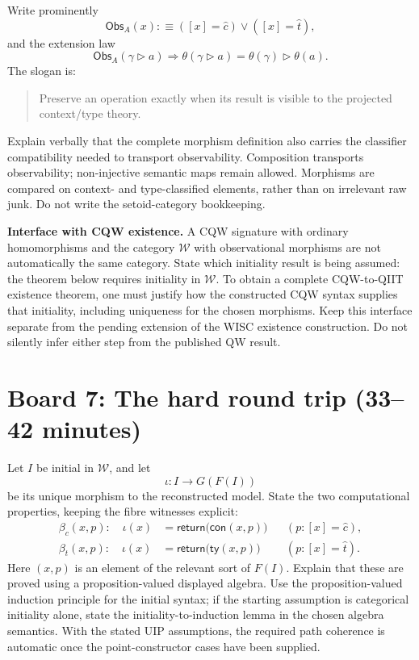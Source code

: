\documentclass[11pt]{article}
\newcommand{\Obs}{\mathsf{Obs}}
\newcommand{\Weak}{\mathcal{W}}
\newcommand{\ret}{\mathsf{return}}
\newcommand{\ext}{\mathbin{\triangleright}}
\newcommand{\ctag}{\widehat c}
\newcommand{\ttag}{\widehat t}
\begin{document}
Write prominently
\[
 \Obs_A(x):\!\!\equiv([x]=\ctag)\lor([x]=\ttag),
\]
and the extension law
\[
 \Obs_A(\gamma\ext a)
 \Longrightarrow
 \theta(\gamma\ext a)=\theta(\gamma)\ext\theta(a).
\]
The slogan is:
\begin{quote}
Preserve an operation exactly when its result is visible to the projected
context/type theory.
\end{quote}
Explain verbally that the complete morphism definition also carries the
classifier compatibility needed to transport observability. Composition
transports observability; non-injective semantic maps remain allowed.
Morphisms are compared on context- and type-classified elements, rather than
on irrelevant raw junk. Do not write the setoid-category bookkeeping.

\textbf{Interface with CQW existence.} A CQW signature with ordinary
homomorphisms and the category \(\Weak\) with observational morphisms are
not automatically the same category. State which initiality result is being
assumed: the theorem below requires initiality in \(\Weak\). To obtain a
complete CQW-to-QIIT existence theorem, one must justify how the constructed
CQW syntax supplies that initiality, including uniqueness for the chosen
morphisms. Keep this interface separate from the pending extension of the
WISC existence construction. Do not silently infer either step from the
published QW result.

\section*{Board 7: The hard round trip (33--42 minutes)}

Let \(I\) be initial in \(\Weak\), and let
\[
 \iota:I\longrightarrow G(F(I))
\]
be its unique morphism to the reconstructed model. State the two
computational properties, keeping the fibre witnesses explicit:
\[
\begin{aligned}
 \beta_c(x,p):\quad
   \iota(x)&=\ret\bigl(\mathsf{con}(x,p)\bigr)
       &&(p:[x]=\ctag),\\
 \beta_t(x,p):\quad
   \iota(x)&=\ret\bigl(\mathsf{ty}(x,p)\bigr)
       &&(p:[x]=\ttag).
\end{aligned}
\]
Here \((x,p)\) is an element of the relevant sort of \(F(I)\).
Explain that these are proved using a proposition-valued displayed algebra.
Use the proposition-valued induction principle for the initial syntax;
if the starting assumption is categorical initiality alone, state the
initiality-to-induction lemma in the chosen algebra semantics. With the
stated UIP assumptions, the required path coherence is automatic once the
point-constructor cases have been supplied.
\end{document}
